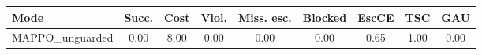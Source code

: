 \begin{tabular}{lcccccccc}
\toprule
\textbf{Mode} & \textbf{Succ.} & \textbf{Cost} & \textbf{Viol.} & \textbf{Miss. esc.} & \textbf{Blocked} & \textbf{EscCE} & \textbf{TSC} & \textbf{GAU} \\
\midrule
MAPPO_unguarded & 0.00 & 8.00 & 0.00 & 0.00 & 0.00 & 0.65 & 1.00 & 0.00 \\
\bottomrule
\end{tabular}
